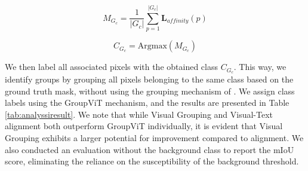 \begin{equation}
\label{eq:mean}
M_{G_c} = \frac{1}{|G_c|} \sum_{p=1}^{|G_c|} \textbf{L}_{affinity}(p)
\end{equation}

\begin{equation}
\label{eq:assignment}
C_{G_c} = \text{Argmax}( M_{G_c})
\end{equation}

We then label all associated pixels with the obtained class $C_{G_c}$. This way, we identify groups by grouping all pixels belonging to the same class based on the ground truth mask, without using the grouping mechanism of \gvit. We assign class labels using the GroupViT mechanism, and the results are presented in Table \ref{tab:analyssiresult}. 
We note that while Visual Grouping and Visual-Text alignment both outperform GroupViT individually, it is evident that Visual Grouping exhibits a larger potential for improvement compared to alignment. We also conducted an evaluation without the background class to report the mIoU score, eliminating the reliance on the susceptibility of the background threshold.

